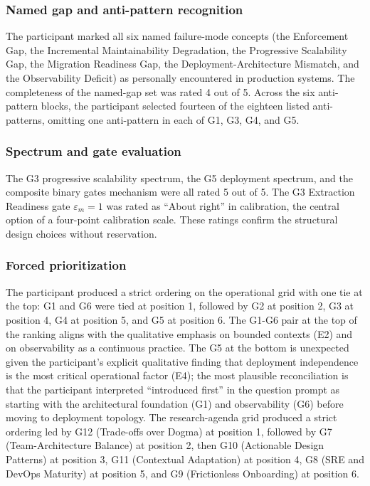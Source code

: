 \subsubsection*{Named gap and anti-pattern recognition}

The participant marked all six named failure-mode concepts (the Enforcement Gap, the Incremental Maintainability Degradation, the Progressive Scalability Gap, the Migration Readiness Gap, the Deployment-Architecture Mismatch, and the Observability Deficit) as personally encountered in production systems. The completeness of the named-gap set was rated 4 out of 5. Across the six anti-pattern blocks, the participant selected fourteen of the eighteen listed anti-patterns, omitting one anti-pattern in each of G1, G3, G4, and G5.

\subsubsection*{Spectrum and gate evaluation}

The G3 progressive scalability spectrum, the G5 deployment spectrum, and the composite binary gates mechanism were all rated 5 out of 5. The G3 Extraction Readiness gate $\varepsilon_m = 1$ was rated as ``About right'' in calibration, the central option of a four-point calibration scale. These ratings confirm the structural design choices without reservation.

\subsubsection*{Forced prioritization}

The participant produced a strict ordering on the operational grid with one tie at the top: G1 and G6 were tied at position 1, followed by G2 at position 2, G3 at position 4, G4 at position 5, and G5 at position 6. The G1-G6 pair at the top of the ranking aligns with the qualitative emphasis on bounded contexts (E2) and on observability as a continuous practice. The G5 at the bottom is unexpected given the participant's explicit qualitative finding that deployment independence is the most critical operational factor (E4); the most plausible reconciliation is that the participant interpreted ``introduced first'' in the question prompt as starting with the architectural foundation (G1) and observability (G6) before moving to deployment topology. The research-agenda grid produced a strict ordering led by G12 (Trade-offs over Dogma) at position 1, followed by G7 (Team-Architecture Balance) at position 2, then G10 (Actionable Design Patterns) at position 3, G11 (Contextual Adaptation) at position 4, G8 (SRE and DevOps Maturity) at position 5, and G9 (Frictionless Onboarding) at position 6.

